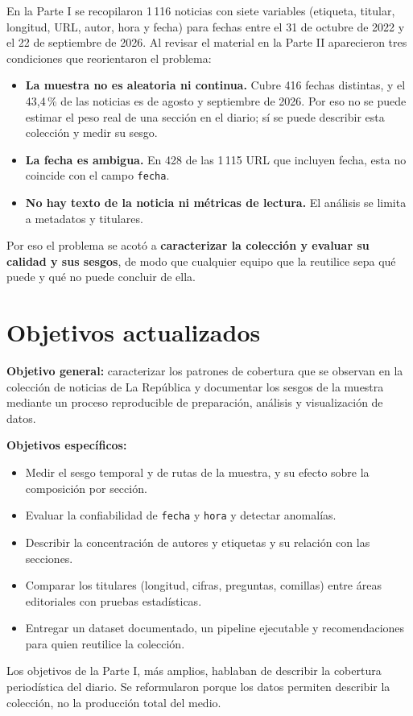 \documentclass[12pt,a4paper]{article}
\begin{document}
En la Parte I se recopilaron 1\,116 noticias con siete variables (etiqueta, titular, longitud, URL, autor, hora y fecha) para fechas entre el 31 de octubre de 2022 y el 22 de septiembre de 2026. Al revisar el material en la Parte II aparecieron tres condiciones que reorientaron el problema:
\begin{itemize}
\item \textbf{La muestra no es aleatoria ni continua.} Cubre 416 fechas distintas, y el 43,4\,\% de las noticias es de agosto y septiembre de 2026. Por eso no se puede estimar el peso real de una sección en el diario; sí se puede describir esta colección y medir su sesgo.
\item \textbf{La fecha es ambigua.} En 428 de las 1\,115 URL que incluyen fecha, esta no coincide con el campo \texttt{fecha}.
\item \textbf{No hay texto de la noticia ni métricas de lectura.} El análisis se limita a metadatos y titulares.
\end{itemize}
Por eso el problema se acotó a \textbf{caracterizar la colección y evaluar su calidad y sus sesgos}, de modo que cualquier equipo que la reutilice sepa qué puede y qué no puede concluir de ella.

\section{Objetivos actualizados}
\textbf{Objetivo general:} caracterizar los patrones de cobertura que se observan en la colección de noticias de La República y documentar los sesgos de la muestra mediante un proceso reproducible de preparación, análisis y visualización de datos.

\textbf{Objetivos específicos:}
\begin{itemize}
\item Medir el sesgo temporal y de rutas de la muestra, y su efecto sobre la composición por sección.
\item Evaluar la confiabilidad de \texttt{fecha} y \texttt{hora} y detectar anomalías.
\item Describir la concentración de autores y etiquetas y su relación con las secciones.
\item Comparar los titulares (longitud, cifras, preguntas, comillas) entre áreas editoriales con pruebas estadísticas.
\item Entregar un dataset documentado, un pipeline ejecutable y recomendaciones para quien reutilice la colección.
\end{itemize}
Los objetivos de la Parte I, más amplios, hablaban de describir la cobertura periodística del diario. Se reformularon porque los datos permiten describir la colección, no la producción total del medio.
\end{document}
